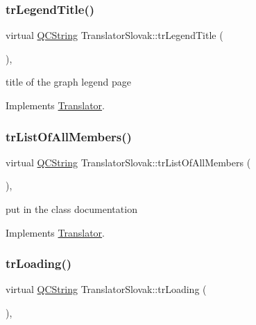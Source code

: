 \subsubsection{\texorpdfstring{trLegendTitle()}{trLegendTitle()}}
{\footnotesize\ttfamily virtual \mbox{\hyperlink{class_q_c_string}{Q\+C\+String}} Translator\+Slovak\+::tr\+Legend\+Title (\begin{DoxyParamCaption}{ }\end{DoxyParamCaption})\hspace{0.3cm}{\ttfamily [inline]}, {\ttfamily [virtual]}}

title of the graph legend page 

Implements \mbox{\hyperlink{class_translator}{Translator}}.

\mbox{\label{class_translator_slovak_a89140622e42d5431182687d4bd9a0bb0}} 
\subsubsection{\texorpdfstring{trListOfAllMembers()}{trListOfAllMembers()}}
{\footnotesize\ttfamily virtual \mbox{\hyperlink{class_q_c_string}{Q\+C\+String}} Translator\+Slovak\+::tr\+List\+Of\+All\+Members (\begin{DoxyParamCaption}{ }\end{DoxyParamCaption})\hspace{0.3cm}{\ttfamily [inline]}, {\ttfamily [virtual]}}

put in the class documentation 

Implements \mbox{\hyperlink{class_translator}{Translator}}.

\mbox{\label{class_translator_slovak_a372bcec5d19f7d766be0d41aa7ab85ba}} 
\subsubsection{\texorpdfstring{trLoading()}{trLoading()}}
{\footnotesize\ttfamily virtual \mbox{\hyperlink{class_q_c_string}{Q\+C\+String}} Translator\+Slovak\+::tr\+Loading (\begin{DoxyParamCaption}{ }\end{DoxyParamCaption})\hspace{0.3cm}{\ttfamily [inline]}, {\ttfamily [virtual]}}

